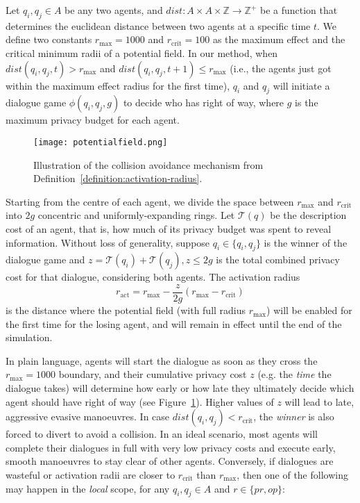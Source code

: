 \documentclass[acmsmall]{custom-arxiv}  %
\begin{document}
Let $q_i, q_j \in A$ be any two agents, and $dist: A \times A \times \mathbb{Z} \rightarrow \mathbb{Z}^+$ be a function that determines the euclidean distance between two agents at a specific time $t$. We define two constants $r_\text{max} = 1000$ and $r_\text{crit} = 100$ as the maximum effect and the critical minimum radii of a potential field. In our method, when $dist(q_i, q_j, t) > r_\text{max}$ and $dist(q_i, q_j, t+1) \leq r_\text{max}$ (i.e., the agents just got within the maximum effect radius for the first time), $q_i$ and $q_j$ will initiate a dialogue game $\phi(q_i, q_j, g)$ to decide who has right of way, where $g$ is the maximum privacy budget for each agent.

\begin{figure}[htb]
\centering
\texttt{[image: potentialfield.png]}
\caption{Illustration of the collision avoidance mechanism from Definition~\ref{definition:activation-radius}.}
\label{fig:potential-field}
\end{figure}

\begin{definition} 
Starting from the centre of each agent, we divide the space between $r_\text{max}$ and $r_\text{crit}$ into $2g$ concentric and uniformly-expanding rings. Let $\mathcal{T}(q)$ be the description cost of an agent, that is, how much of its privacy budget was spent to reveal information. Without loss of generality, suppose $q_i \in \{q_i, q_j\}$ is the winner of the dialogue game and $z = \mathcal{T}(q_i) + \mathcal{T}(q_j), z \leq 2g$ is the total combined privacy cost for that dialogue, considering both agents. The activation radius $$r_\text{act} = r_\text{max} - \frac{z}{2g} (r_\text{max} - r_\text{crit})$$ is the distance where the potential field (with full radius $r_\text{max}$) will be enabled for the first time for the losing agent, and will remain in effect until the end of the simulation.
\label{definition:activation-radius}
\end{definition}



In plain language, agents will start the dialogue as soon as they cross the $r_\text{max} = 1000$ boundary, and their cumulative privacy cost $z$ (e.g. the \textit{time} the dialogue takes) will determine how early or how late they ultimately decide which agent should have right of way (see Figure~\ref{fig:potential-field}). Higher values of $z$ will lead to late, aggressive evasive manoeuvres. In case $dist(q_i, q_j) < r_\text{crit}$, the \textit{winner} is also forced to divert to avoid a collision. In an ideal scenario, most agents will complete their dialogues in full with very low privacy costs and execute early, smooth manoeuvres to stay clear of other agents. Conversely, if dialogues are wasteful or activation radii are closer to $r_\text{crit}$ than $r_\text{max}$, then one of the following may happen in the \textit{local} scope, for any $q_i, q_j \in A$ and $r \in \{pr, op\}$: 
\end{document}
